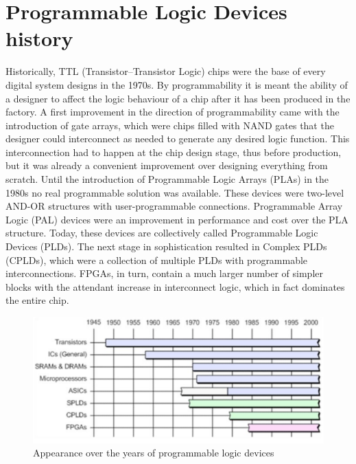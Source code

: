 \section{Programmable Logic Devices history}
\noindent Historically, TTL (Transistor–Transistor Logic) chips were the base of every digital system designs in
the 1970s.
By programmability it is meant the ability of a
designer to affect the logic behaviour of a chip after it has been produced in the factory.
\newline
\noindent A first improvement in the direction of programmability came with the introduction of gate
arrays, which were chips filled with NAND gates that the designer could
interconnect as needed to generate any desired logic function.
This interconnection had to happen
at the chip design stage, thus before production, but it was already a convenient improvement over
designing everything from scratch. Until the introduction of Programmable Logic
Arrays (PLAs) in the 1980s no real programmable solution was available. These devices were two-level AND-OR
structures with user-programmable connections.
\newline 
\noindent Programmable Array Logic (PAL) devices were an
improvement in performance and cost over the PLA structure. Today, these devices are collectively
called Programmable Logic Devices (PLDs).
\newline
\noindent The next stage in sophistication resulted in Complex PLDs (CPLDs), which were a collection of multiple PLDs with programmable interconnections. FPGAs, in turn, contain a
much larger number of simpler blocks with the attendant increase in interconnect logic, which in fact
dominates the entire chip.
\begin{figure}[H]
	\centering
	\includegraphics[width=0.7\linewidth]{IMG/ch3/TIME}
	\caption{Appearance over the years of programmable logic devices\cite{fpga3}}
	\label{fig:time}
\end{figure}
